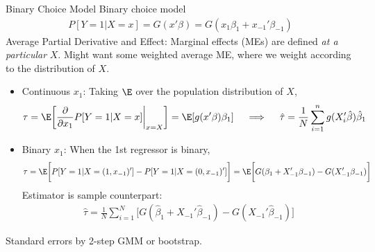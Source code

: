 \documentclass[aspectratio=169, handout]{beamer}
\newcommand{\sumin}{\sum^n_{i=1}}
\newcommand{\sumiN}{\sum^N_{i=1}}
\begin{document}
{\scriptsize
\begin{frame}{Binary Choice Model}
Binary choice model
\begin{align*}
  P[Y=1|X=x]
  =
  G(x'\beta)
  =
  G(x_1\beta_{1} + x_{-1}'\beta_{-1})
\end{align*}
\alert{Average Partial Derivative and Effect}:
Marginal effects (MEs) are defined \emph{at a particular} $X$.  Might
want some weighted average ME, where we weight according to the
distribution of $X$.
\begin{itemize}
  \item \alert{Continuous $x_1$}:
    Taking $\E$ over the population distribution of $X$,
    \begin{align*}
      \tau
      =
      \E\bigg[
      \frac{\partial }{\partial x_1}
      P[Y=1|X=x]
      \bigg|_{x=X}
      \bigg]
      =
      \E[g(x'\beta)\beta_{1}]
      \quad\implies\quad
      \hat{\tau}
      =
      \frac{1}{N}
      \sumin
      g(X_i'\hat{\beta})\hat{\beta}_1
    \end{align*}
  \item \alert{Binary $x_1$}:
    When the 1st regressor is binary,
    \begin{align*}
      \tau
      =
      \E\bigg[
      P[Y=1|X=(1,x_{-1})']
      -
      P[Y=1|X=(0,x_{-1})']
      \bigg]
      =
      \E\bigg[
      G(\beta_{1} + X_{-1}'\beta_{-1})
      -
      G(X_{-1}'\beta_{-1})
      \bigg]
    \end{align*}
    Estimator is sample counterpart:
    \begin{align*}
      \hat{\tau}
      =
      \frac{1}{N}
      \sumiN
      \bigg[
      G(\hat{\beta}_{1} + X_{-1}'\hat{\beta}_{-1})
      -
      G(X_{-1}'\hat{\beta}_{-1})
      \bigg]
    \end{align*}

\end{itemize}
Standard errors by 2-step GMM or bootstrap.
\end{frame}
}
\end{document}
